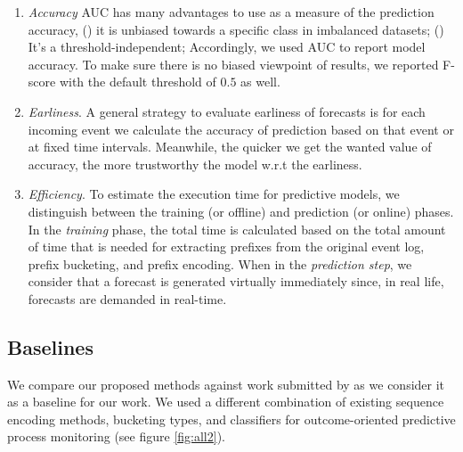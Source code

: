\begin{enumerate}
		\item \textit{Accuracy} AUC has many advantages to use as a measure of the prediction accuracy, () it is unbiased towards a specific class in imbalanced datasets; () It’s a threshold-independent; Accordingly, we used AUC to report model accuracy. To make sure there is no biased viewpoint of results, we reported F-score with the default threshold of $0.5$ as well.
		
		\item \textit{Earliness}. A general strategy to evaluate earliness of forecasts is for each incoming event we calculate the accuracy of prediction based on that event or at fixed time intervals. Meanwhile, the quicker we get the wanted value of accuracy, the more trustworthy the model w.r.t the earliness.
		
		
		\item \textit{Efficiency}. To estimate the execution time for predictive models, we distinguish between the training (or offline) and prediction (or online) phases. In the \textit{training} phase, the total time is calculated based on the total amount of time that is needed for extracting prefixes from the original event log, prefix bucketing, and prefix encoding. When in the \textit{prediction step}, we consider that a forecast is generated virtually immediately since, in real life, forecasts are demanded in real-time. 
		
\end{enumerate}
	


\subsection{Baselines}
We compare our proposed methods against work submitted by \cite{teinemaa2019outcome} as we consider it as a baseline for our work. We used a different combination of existing sequence encoding methods, bucketing types, and classifiers for outcome-oriented predictive process monitoring (see figure \ref{fig:all2}). 

